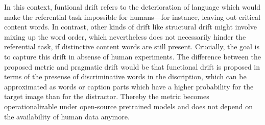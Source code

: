 In this context, funtional drift refers to the deterioration of language which would make the referential task impossible for humans---for instance, leaving out critical content words. 
In contrast, other kinds of drift like structural drift might involve mixing up the word order, which nevertheless does not necessarily hinder the referential task, if distinctive content words are still present. %
Crucially, the goal is to capture this drift in absense of human experiments. The difference between the proposed metric and pragmatic drift would be that functional drift is proposed in terms of the presense of discriminative words in the discription, which can be approximated as words or caption parts which have a higher probability for the target image than for the distractor. Thereby the metric becomes operationalizable under open-source pretrained models and does not depend on the availability of human data anymore. 

